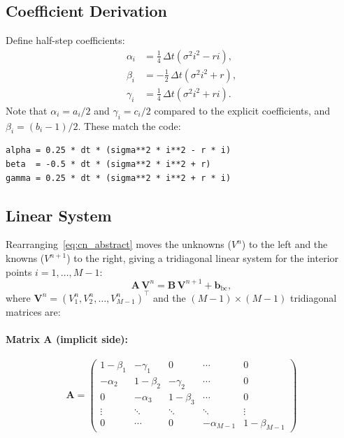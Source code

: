 \documentclass[12pt, a4paper]{article}
\begin{document}
\subsection{Coefficient Derivation}

Define half-step coefficients:
\begin{align}
    \alpha_i &= \frac{1}{4}\,\Delta t\!\left(\sigma^2 i^2 - ri\right),
    \label{eq:alpha} \\
    \beta_i  &= -\frac{1}{2}\,\Delta t\!\left(\sigma^2 i^2 + r\right),
    \label{eq:beta} \\
    \gamma_i &= \frac{1}{4}\,\Delta t\!\left(\sigma^2 i^2 + ri\right).
    \label{eq:gamma}
\end{align}
Note that $\alpha_i = a_i/2$ and $\gamma_i = c_i/2$ compared to the explicit
coefficients, and $\beta_i = (b_i - 1)/2$. These match the code:
\begin{lstlisting}
alpha = 0.25 * dt * (sigma**2 * i**2 - r * i)
beta  = -0.5 * dt * (sigma**2 * i**2 + r)
gamma = 0.25 * dt * (sigma**2 * i**2 + r * i)
\end{lstlisting}

\subsection{Linear System}

Rearranging~\eqref{eq:cn_abstract} moves the unknowns ($V^n$) to the left and
the knowns ($V^{n+1}$) to the right, giving a tridiagonal linear system for
the interior points $i = 1, \ldots, M-1$:
\begin{equation}
    \mathbf{A}\,\bm{V}^n = \mathbf{B}\,\bm{V}^{n+1} + \bm{b}_{\text{bc}},
    \label{eq:linsys}
\end{equation}
where $\bm{V}^n = (V_1^n, V_2^n, \ldots, V_{M-1}^n)^\top$ and the
$(M-1)\times(M-1)$ tridiagonal matrices are:

\paragraph{Matrix $\mathbf{A}$ (implicit side):}
\begin{equation}
    \mathbf{A} =
    \begin{pmatrix}
    1-\beta_1   & -\gamma_1  & 0          & \cdots & 0 \\
    -\alpha_2   & 1-\beta_2  & -\gamma_2  & \cdots & 0 \\
    0           & -\alpha_3  & 1-\beta_3  & \cdots & 0 \\
    \vdots      & \ddots     & \ddots     & \ddots & \vdots \\
    0           & \cdots     & 0          & -\alpha_{M-1} & 1-\beta_{M-1}
    \end{pmatrix}
    \label{eq:A_matrix}
\end{equation}
\end{document}
